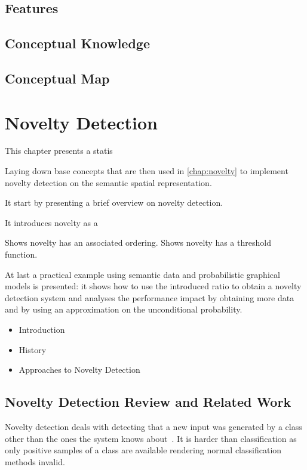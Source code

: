 \section{Features}
\section{Conceptual Knowledge}
\section{Conceptual Map}

\chapter{Novelty Detection}\label{chap:novelty-intro}

This chapter presents a statis

Laying down base concepts that are then used in \autoref{chap:novelty} to
implement novelty detection on the semantic spatial representation.

It start by presenting a brief overview on novelty detection.

It introduces novelty as a 

Shows novelty has an associated ordering.
Shows novelty has a threshold function.


At last a practical example using semantic data and probabilistic graphical
models is presented: it shows how to use the introduced ratio to obtain a
novelty detection system and analyses the performance impact by obtaining more
data and by using an approximation on the unconditional probability.


\begin{itemize}
\item Introduction
\item History
\item Approaches to Novelty Detection
\end{itemize}

\section{Novelty Detection Review and Related Work}
Novelty detection deals with detecting that a new input was generated by a class
other than the ones the system knows about~\cite{markou2003novelty}.
It is harder than classification as only positive samples of a class are available
rendering normal classification methods invalid.


